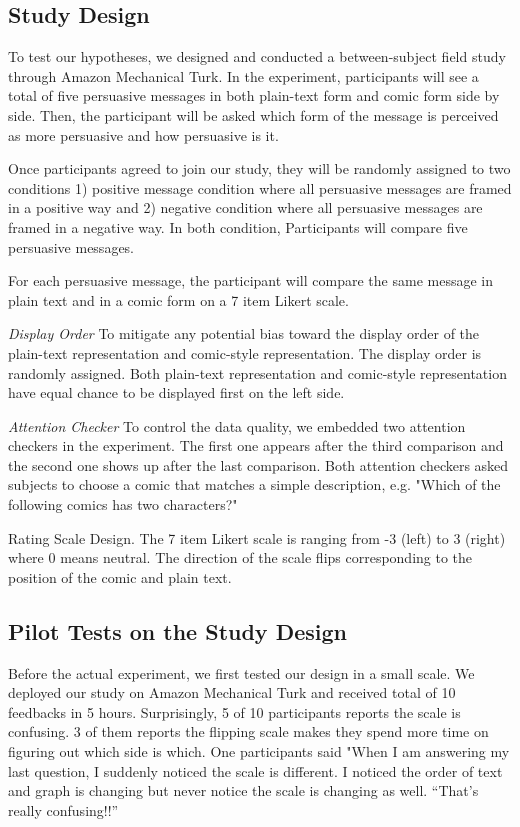 \subsection{Study Design}
To test our hypotheses, we designed and conducted a between-subject field study through Amazon Mechanical Turk. In the experiment, participants will see a total of five persuasive messages in both plain-text form and comic form side by side. Then, the participant will be asked which form of the message is perceived as more persuasive and how persuasive is it.\par
Once participants agreed to join our study, they will be randomly assigned to two conditions 1) positive message condition where all persuasive messages are framed in a positive way and 2) negative condition where all persuasive messages are framed in a negative way. In both condition, Participants will compare five persuasive messages.\par
For each persuasive message, the participant will compare the same message in plain text and in a comic form on a 7 item Likert scale. \par
\textit{Display Order} To mitigate any potential bias toward the display order of the plain-text representation and comic-style representation. The display order is randomly assigned. Both plain-text representation and comic-style representation have equal chance to be displayed first on the left side.\par
\textit{Attention Checker} To control the data quality, we embedded two attention checkers in the experiment. The first one appears after the third comparison and the second one shows up after the last comparison. Both attention checkers asked subjects to choose a comic that matches a simple description, e.g. "Which of the following comics has two characters?"\par
Rating Scale Design. The 7 item Likert scale is ranging from -3 (left) to 3 (right) where 0 means neutral. The direction of the scale flips corresponding to the position of the comic and plain text. \par
\subsection{Pilot Tests on the Study Design}
Before the actual experiment, we first tested our design in a small scale. We deployed our study on Amazon Mechanical Turk and received total of 10 feedbacks in 5 hours. Surprisingly, 5 of 10 participants reports the scale is confusing. 3 of them reports the flipping scale makes they spend more time on figuring out which side is which. One participants said "When I am answering my last question, I suddenly noticed the scale is different. I noticed the order of text and graph is changing but never notice the scale is changing as well. ``That's really confusing!!''



